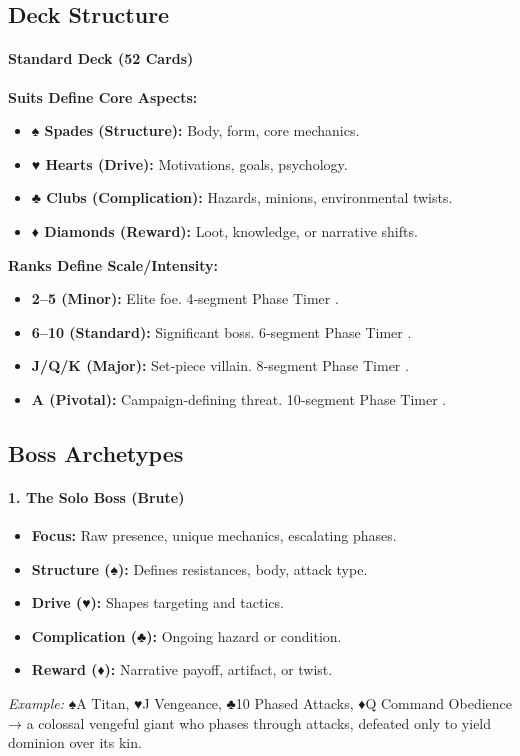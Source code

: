 \subsection{Deck Structure}
\paragraph{Standard Deck (52 Cards)}
\textbf{Suits Define Core Aspects:}
\begin{itemize}
    \item \textbf{♠ Spades (Structure):} Body, form, core mechanics.
    \item \textbf{♥ Hearts (Drive):} Motivations, goals, psychology.
    \item \textbf{♣ Clubs (Complication):} Hazards, minions, environmental twists.
    \item \textbf{♦ Diamonds (Reward):} Loot, knowledge, or narrative shifts.
\end{itemize}
\textbf{Ranks Define Scale/Intensity:}
\begin{itemize}
    \item \textbf{2--5 (Minor):} Elite foe. 4‑segment Phase Timer .
    \item \textbf{6--10 (Standard):} Significant boss. 6‑segment Phase Timer .
    \item \textbf{J/Q/K (Major):} Set‑piece villain. 8‑segment Phase Timer .
    \item \textbf{A (Pivotal):} Campaign‑defining threat. 10‑segment Phase Timer .
\end{itemize}

\subsection{Boss Archetypes}
\paragraph{1. The Solo Boss (Brute)}
\begin{itemize}
    \item \textbf{Focus:} Raw presence, unique mechanics, escalating phases.
    \item \textbf{Structure (♠):} Defines resistances, body, attack type.
    \item \textbf{Drive (♥):} Shapes targeting and tactics.
    \item \textbf{Complication (♣):} Ongoing hazard or condition.
    \item \textbf{Reward (♦):} Narrative payoff, artifact, or twist.
\end{itemize}
\emph{Example:} ♠A Titan, ♥J Vengeance, ♣10 Phased Attacks, ♦Q Command Obedience → a colossal vengeful giant who phases through attacks, defeated only to yield dominion over its kin.


